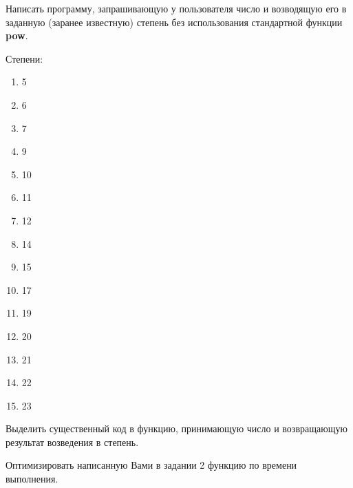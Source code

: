 
\labtask

Написать программу, запрашивающую у пользователя число и возводящую его в заданную (заранее известную) степень
без использования стандартной функции \textbf{pow}.

Степени:

\begin{enumerate}

\item 5

\item 6

\item  7

\item  9

\item  10

\item  11

\item  12

\item  14

\item  15

\item  17

\item  19

\item  20

\item  21

\item  22

\item  23

\end{enumerate}


\labtask

Выделить существенный код в функцию, принимающую число и возвращающую результат возведения в степень.

\labtask

Оптимизировать написанную Вами в задании 2 функцию по времени выполнения.
